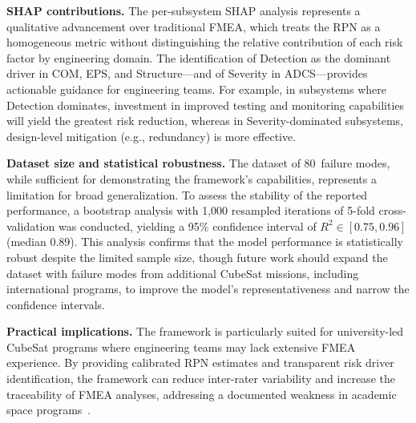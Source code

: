 \textbf{SHAP contributions.} The per-subsystem SHAP analysis represents a qualitative advancement over traditional FMEA, which treats the RPN as a homogeneous metric without distinguishing the relative contribution of each risk factor by engineering domain. The identification of Detection as the dominant driver in COM, EPS, and Structure---and of Severity in ADCS---provides actionable guidance for engineering teams. For example, in subsystems where Detection dominates, investment in improved testing and monitoring capabilities will yield the greatest risk reduction, whereas in Severity-dominated subsystems, design-level mitigation (e.g., redundancy) is more effective.

\textbf{Dataset size and statistical robustness.} The dataset of 80~failure modes, while sufficient for demonstrating the framework's capabilities, represents a limitation for broad generalization. To assess the stability of the reported performance, a bootstrap analysis with 1{,}000 resampled iterations of 5-fold cross-validation was conducted, yielding a 95\% confidence interval of $R^2 \in [0.75, 0.96]$ (median $0.89$). This analysis confirms that the model performance is statistically robust despite the limited sample size, though future work should expand the dataset with failure modes from additional CubeSat missions, including international programs, to improve the model's representativeness and narrow the confidence intervals.

\textbf{Practical implications.} The framework is particularly suited for university-led CubeSat programs where engineering teams may lack extensive FMEA experience. By providing calibrated RPN estimates and transparent risk driver identification, the framework can reduce inter-rater variability and increase the traceability of FMEA analyses, addressing a documented weakness in academic space programs~\cite{villela2019towards}.
